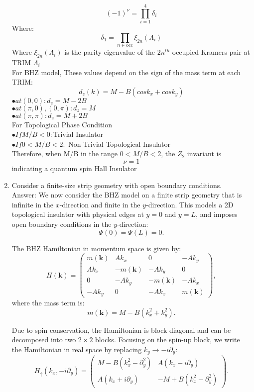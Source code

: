 \documentclass[a4paper,12pt]{article}
\begin{document}
\begin{enumerate}
\[(-1)^{\nu} = \prod_{i=1}^{4} \delta_{i}
\]
Where:
\[\delta_{1} = \prod_{n \in \text{occ}} \xi_{2n}(\Lambda_i)
\]
Where $\xi_{2n}(\Lambda_{i})$ is the parity eigenvalue of the $2n^{th}$ occupied Kramers pair at TRIM $\Lambda_{i}$\\
For BHZ model, These values depend on the sign of the mass term at each TRIM:\\
\[d_{z}(k) = M- B(cos k_{x} + cos k_{y})\]
$\bullet at (0,0): d_{z} = M - 2B$\\
$\bullet at (\pi,0),(0,\pi): d_{z} = M$\\
$\bullet at (\pi,\pi): d_{z} = M + 2B$\\
For Topological Phase Condition\\
$\bullet If M/B < 0:$Trivial Insulator\\
$\bullet If 0 < M/B < 2:$ Non Trivial Topological Insulator\\
Therefore, when M/B in the range $0 < M/B < 2$, the $Z_{2}$ invariant is \\
\[\nu = 1\]
indicating a quantum spin Hall Insulator


    \item Consider a finite-size strip geometry with open boundary conditions.\\
Answer: We now consider the BHZ model on a finite strip geometry that is infinite in the \( x \)-direction and finite in the \( y \)-direction. This models a 2D topological insulator with physical edges at \( y = 0 \) and \( y = L \), and imposes open boundary conditions in the \( y \)-direction:
\[
\Psi(0) = \Psi(L) = 0.
\]

The BHZ Hamiltonian in momentum space is given by:
\[
H(\mathbf{k}) =
\begin{pmatrix}
    m(\mathbf{k}) & A k_x & 0 & -A k_y \\
    A k_x & -m(\mathbf{k}) & -A k_y & 0 \\
    0 & -A k_y & -m(\mathbf{k}) & -A k_x \\
    -A k_y & 0 & -A k_x & m(\mathbf{k})
\end{pmatrix},
\]
where the mass term is:
\[
m(\mathbf{k}) = M - B(k_x^2 + k_y^2).
\]

Due to spin conservation, the Hamiltonian is block diagonal and can be decomposed into two \( 2 \times 2 \) blocks. Focusing on the spin-up block, we write the Hamiltonian in real space by replacing \( k_y \to -i \partial_y \):
\[
H_\uparrow(k_x, -i \partial_y) =
\begin{pmatrix}
M - B(k_x^2 - \partial_y^2) & A(k_x - i \partial_y) \\
A(k_x + i \partial_y) & -M + B(k_x^2 - \partial_y^2)
\end{pmatrix}.
\]


\end{enumerate}
\end{document}
